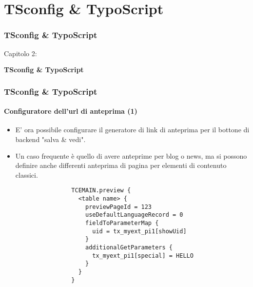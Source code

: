 %

\section{TSconfig \& TypoScript}
\begin{frame}[fragile]
	\frametitle{TSconfig \& TypoScript}

	\begin{center}\huge{Capitolo 2:}\end{center}
	\begin{center}\huge{\color{typo3darkgrey}\textbf{TSconfig \& TypoScript}}\end{center}

\end{frame}

\begin{frame}[fragile]
	\frametitle{TSconfig \& TypoScript}
	\framesubtitle{Configuratore dell'url di anteprima (1)}

	\lstset{basicstyle=\tiny\ttfamily}

	\begin{itemize}

		\item E' ora possibile configurare il generatore di link di anteprima per\newline
			il bottone di backend "salva \& vedi".

		\item Un caso frequente è quello di avere anteprime per blog o news, ma si
			possono definire anche differenti anteprima di pagina per elementi di contenuto classici.

			\begin{lstlisting}
				TCEMAIN.preview {
				  <table name> {
				    previewPageId = 123
				    useDefaultLanguageRecord = 0
				    fieldToParameterMap {
				      uid = tx_myext_pi1[showUid]
				    }
				    additionalGetParameters {
				      tx_myext_pi1[special] = HELLO
				    }
				  }
				}
			\end{lstlisting}

	\end{itemize}

\end{frame}

